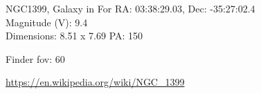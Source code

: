 \begin{block}{NGC1399, Galaxy in For}
    RA: 03:38:29.03, Dec: -35:27:02.4 \\ 
    Magnitude (V): 9.4 \\ 
    Dimensions: 8.51 x 7.69 PA: 150 

    Finder fov: 60 

    \url{https://en.wikipedia.org/wiki/NGC_1399} 
\end{block}